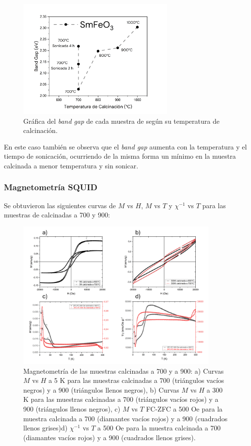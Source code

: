 \documentclass[../main.tex]{subfiles}
\begin{document}
\begin{figure}[H]
    \centering
    \includegraphics[width=0.7\textwidth]{fig/BGSmFeO3.png}
    \caption{Gráfica del \textit{band gap} de cada muestra de \sama{} según su temperatura de calcinación.}
    \label{fig:bandgapvT}
\end{figure}
En este caso también se observa que el \textit{band gap} aumenta con la temperatura y el tiempo de sonicación, ocurriendo de la misma forma un mínimo en la muestra calcinada a menor temperatura y sin sonicar.
\subsubsection{Magnetometría SQUID}
Se obtuvieron las siguientes curvas de $M$ vs $H$, $M$ vs $T$ y $\chi^{-1}$ vs $T$ para las muestras de \sama{}  calcinadas a 700\gradoC{} y 900\gradoC{}:
\begin{figure}[H]
    \centering
    \includegraphics[width=0.9\textwidth]{fig/Magnetometria_SmFeO3_calc.png}
    \caption{Magnetometría de las muestras \sama{} calcinadas a 700\gradoC{} y a 900\gradoC{}: a) Curvas $M$ vs $H$ a 5 K para las muestras calcinadas a 700\gradoC{}  (triángulos vacíos negros) y a 900\gradoC{} (triángulos llenos negros), b) Curvas $M$ vs $H$ a 300 K para las muestras calcinadas a 700\gradoC{}  (triángulos vacíos rojos) y a 900\gradoC{} (triángulos llenos negros), c)   $M$ vs $T$ FC-ZFC a 500 Oe para la muestra calcinada a 700\gradoC{} (diamantes vacíos rojos) y a 900\gradoC{} (cuadrados llenos grises)d) $\chi^{-1}$ vs $T$ a 500 Oe para la muestra calcinada a 700\gradoC{} (diamantes vacíos rojos) y a 900\gradoC{} (cuadrados llenos grises).}
    \label{fig:mvhSm}
\end{figure}
\end{document}
